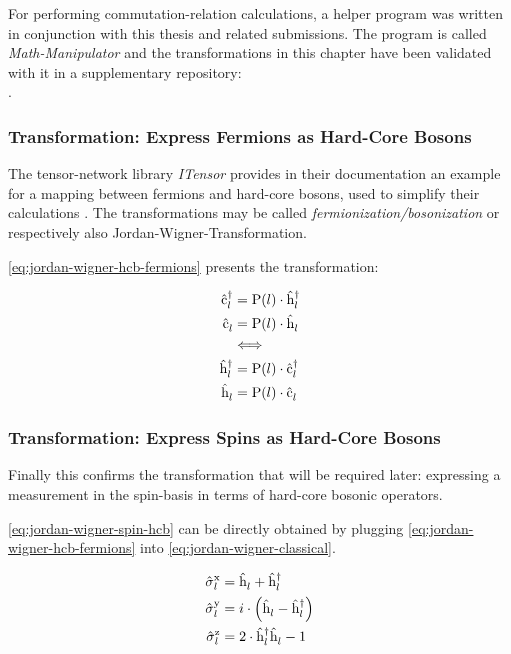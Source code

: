 For performing commutation-relation calculations, a helper program was written in conjunction with this thesis and related submissions.
The program is called \emph{Math-Manipulator} \cite{selfMathManipulator} and the transformations in this chapter have been validated with it in a supplementary repository:\\ .


\subsubsection*{Transformation: Express Fermions as Hard-Core Bosons}
The tensor-network library \emph{ITensor} provides in their documentation an example for a mapping between fermions and hard-core bosons, used to simplify their calculations \cite{itensorFermionizationLibrary}.
The transformations may be called \emph{fermionization/bosonization} or respectively also Jordan-Wigner-Transformation.

\autoref{eq:jordan-wigner-hcb-fermions} presents the transformation:

\begin{equation}
    \label{eq:jordan-wigner-hcb-fermions}
    \begin{split}
        \cop{l}{\dagger} &= \text{P}(l) \cdot \hop{l}{\dagger}\\
        \cop{l}{} &= \text{P}(l) \cdot \hop{l}{}\\
        &\Longleftrightarrow \\
        \hop{l}{\dagger} &= \text{P}(l) \cdot \cop{l}{\dagger}\\
        \hop{l}{} &= \text{P}(l) \cdot \cop{l}{}\\
    \end{split}
\end{equation}

\subsubsection*{Transformation: Express Spins as Hard-Core Bosons}
Finally this confirms the transformation that will be required later: expressing a measurement in the spin-basis in terms of hard-core bosonic operators.

\autoref{eq:jordan-wigner-spin-hcb} can be directly obtained by plugging \autoref{eq:jordan-wigner-hcb-fermions} into \autoref{eq:jordan-wigner-classical}.

\begin{equation}
    \label{eq:jordan-wigner-spin-hcb}
    \begin{split}
        \pauli[l]{x} &= \hop{l}{} + \hop{l}{\dagger} \\
        \pauli[l]{y} &= i \cdot \left(\hop{l}{} - \hop{l}{\dagger}\right) \\
        \pauli[l]{z} &= 2 \cdot \hop{l}{\dagger}\hop{l}{} -1
    \end{split}
\end{equation}

